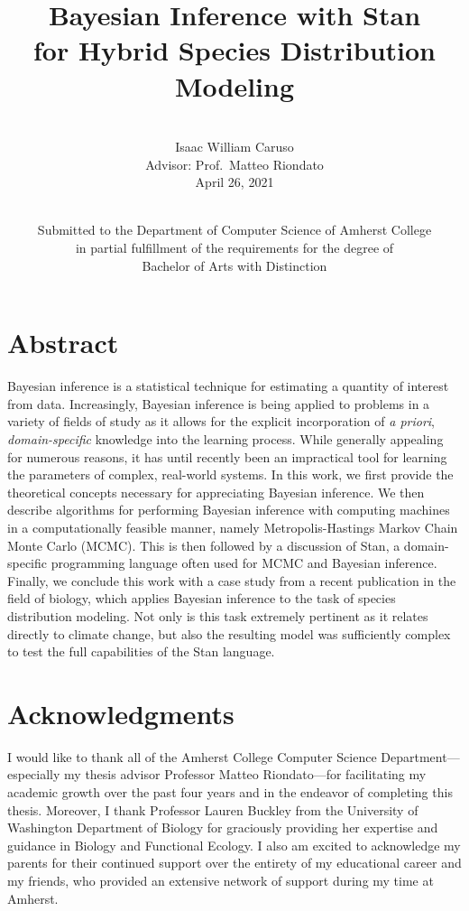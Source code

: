 \documentclass[
  12pt,
  twoside]{book}
\title{Bayesian Inference with Stan\\
for Hybrid Species Distribution Modeling}
\subtitle{\hfill\break
\vspace{+20truemm}\\
Isaac William Caruso\\
Advisor: Prof.~Matteo Riondato\\
April 26, 2021}
\author{\vspace{+45truemm}\\
Submitted to the Department of Computer Science of Amherst College\\
in partial fulfillment of the requirements for the degree of\\
Bachelor of Arts with Distinction}
\date{}
\theoremstyle{definition}
\theoremstyle{definition}
\theoremstyle{definition}
\theoremstyle{remark}
\begin{document}
\maketitle

{
\setcounter{tocdepth}{1}
\tableofcontents
}
\hypertarget{abstract}{%
\chapter*{Abstract}\label{abstract}}

Bayesian inference is a statistical technique for estimating a quantity of interest from data.
Increasingly, Bayesian inference is being applied to problems in a variety of fields of study as it allows for the explicit incorporation of \emph{a priori}, \emph{domain-specific} knowledge into the learning process.
While generally appealing for numerous reasons, it has until recently been an impractical tool for learning the parameters of complex, real-world systems.
In this work, we first provide the theoretical concepts necessary for appreciating Bayesian inference.
We then describe algorithms for performing Bayesian inference with computing machines in a computationally feasible manner, namely Metropolis-Hastings Markov Chain Monte Carlo (MCMC).
This is then followed by a discussion of Stan, a domain-specific programming language often used for MCMC and Bayesian inference.
Finally, we conclude this work with a case study from a recent publication in the field of biology, which applies Bayesian inference to the task of species distribution modeling.
Not only is this task extremely pertinent as it relates directly to climate change, but also the resulting model was sufficiently complex to test the full capabilities of the Stan language.

\hypertarget{acknowledgments}{%
\chapter*{Acknowledgments}\label{acknowledgments}}

I would like to thank all of the Amherst College Computer Science Department---especially my thesis advisor Professor Matteo Riondato---for facilitating my academic growth over the past four years and in the endeavor of completing this thesis.
Moreover, I thank Professor Lauren Buckley from the University of Washington Department of Biology for graciously providing her expertise and guidance in Biology and Functional Ecology.
I also am excited to acknowledge my parents for their continued support over the entirety of my educational career and my friends, who provided an extensive network of support during my time at Amherst.
\end{document}
